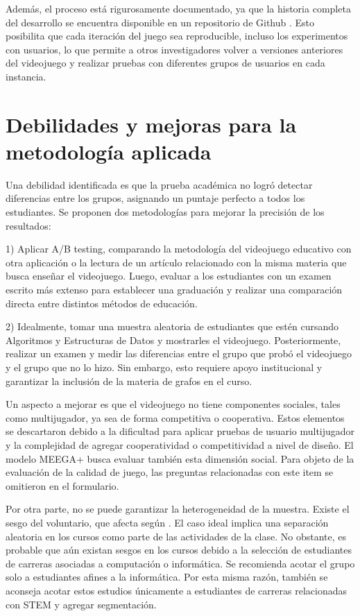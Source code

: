 Además, el proceso está rigurosamente documentado, ya que la historia completa del desarrollo se encuentra disponible en un repositorio de Github \cite{GithubRepo}. Esto posibilita que cada iteración del juego sea reproducible, incluso los experimentos con usuarios, lo que permite a otros investigadores volver a versiones anteriores del videojuego y realizar pruebas con diferentes grupos de usuarios en cada instancia.

\section{Debilidades y mejoras para la metodología aplicada}

Una debilidad identificada es que la prueba académica no logró detectar diferencias entre los grupos, asignando un puntaje perfecto a todos los estudiantes. Se proponen dos metodologías para mejorar la precisión de los resultados:

1) Aplicar A/B testing, comparando la metodología del videojuego educativo con otra aplicación o la lectura de un artículo relacionado con la misma materia que busca enseñar el videojuego. Luego, evaluar a los estudiantes con un examen escrito más extenso para establecer una graduación y realizar una comparación directa entre distintos métodos de educación.

2) Idealmente, tomar una muestra aleatoria de estudiantes que estén cursando Algoritmos y Estructuras de Datos y mostrarles el videojuego. Posteriormente, realizar un examen y medir las diferencias entre el grupo que probó el videojuego y el grupo que no lo hizo. Sin embargo, esto requiere apoyo institucional y garantizar la inclusión de la materia de grafos en el curso.

Un aspecto a mejorar es que el videojuego no tiene componentes sociales, tales como multijugador, ya sea de forma competitiva o cooperativa. Estos elementos se descartaron debido a la dificultad para aplicar pruebas de usuario multijugador y la complejidad de agregar cooperatividad o competitividad a nivel de diseño. El modelo MEEGA+ \cite{meegaplus} busca evaluar también esta dimensión social. Para objeto de la evaluación de la calidad de juego, las preguntas relacionadas con este item se omitieron en el formulario.

Por otra parte, no se puede garantizar la heterogeneidad de la muestra. Existe el sesgo del voluntario, que afecta según \cite{volunterBias}. El caso ideal implica una separación aleatoria en los cursos como parte de las actividades de la clase. No obstante, es probable que aún existan sesgos en los cursos debido a la selección de estudiantes de carreras asociadas a computación o informática. Se recomienda acotar el grupo solo a estudiantes afines a la informática. Por esta misma razón, también se aconseja acotar estos estudios únicamente a estudiantes de carreras relacionadas con STEM y agregar segmentación.

